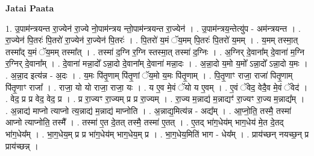 \documentclass[17pt]{extarticle}
\begin{document}
\textbf{Jatai Paata} \newline

1. उ॒पाम॑न्त्रयन्त रा॒ज्येन॑ रा॒ज्ये नो॒पाम॑न्त्रय न्तो॒पाम॑न्त्रयन्त रा॒ज्येन॑ । . उ॒पाम॑न्त्रय॒न्तेत्यु॑प - अम॑न्त्रयन्त । . रा॒ज्येन॑ पि॒तरः॑ पि॒तरो॑ रा॒ज्येन॑ रा॒ज्येन॑ पि॒तरः॑ । . पि॒तरो॑ य॒मं ॅय॒मम् पि॒तरः॑ पि॒तरो॑ य॒मम् । . य॒मम् तस्मा॒त् तस्मा᳚द् य॒मं ॅय॒मम् तस्मा᳚त् । . तस्मा॑ द॒ग्नि र॒ग्नि स्तस्मा॒त् तस्मा॑ द॒ग्निः । . अ॒ग्निर् दे॒वाना᳚म् दे॒वाना॑ म॒ग्नि र॒ग्निर् दे॒वाना᳚म् । . दे॒वाना॑ मन्ना॒दो᳚ ऽन्ना॒दो दे॒वाना᳚म् दे॒वाना॑ मन्ना॒दः । . अ॒न्ना॒दो य॒मो य॒मो᳚ ऽन्ना॒दो᳚ ऽन्ना॒दो य॒मः । . अ॒न्ना॒द इत्य॑न्न - अ॒दः । . य॒मः पि॑तृ॒णाम् पि॑तृ॒णां ॅय॒मो य॒मः पि॑तृ॒णाम् । . पि॒तृ॒णाꣳ राजा॒ राजा॑ पितृ॒णाम् पि॑तृ॒णाꣳ राजा᳚ । . राजा॒ यो यो राजा॒ राजा॒ यः । . य ए॒व मे॒वं ॅयो य ए॒वम् । . ए॒वं ॅवेद॒ वेदै॒व मे॒वं ॅवेद॑ । . वेद॒ प्र प्र वेद॒ वेद॒ प्र । . प्र रा॒ज्यꣳ रा॒ज्यम् प्र प्र रा॒ज्यम् । . रा॒ज्य म॒न्नाद्य॑ म॒न्नाद्यꣳ॑ रा॒ज्यꣳ रा॒ज्य म॒न्नाद्य᳚म् । . अ॒न्नाद्य॑ माप्नो त्याप्नो त्य॒न्नाद्य॑ म॒न्नाद्य॑ माप्नोति । . अ॒न्नाद्य॒मित्य॑न्न - अद्य᳚म् । . आ॒प्नो॒ति॒ तस्मै॒ तस्मा॑ आप्नो त्याप्नोति॒ तस्मै᳚ । . तस्मा॑ ए॒त दे॒तत् तस्मै॒ तस्मा॑ ए॒तत् । . ए॒तद् भा॑ग॒धेय॑म् भाग॒धेय॑ मे॒त दे॒तद् भा॑ग॒धेय᳚म् । . भा॒ग॒धेय॒म् प्र प्र भा॑ग॒धेय॑म् भाग॒धेय॒म् प्र । . भा॒ग॒धेय॒मिति॑ भाग - धेय᳚म् । . प्राय॑च्छन् नयच्छ॒न् प्र प्राय॑च्छन्न् । \newline
\end{document}
